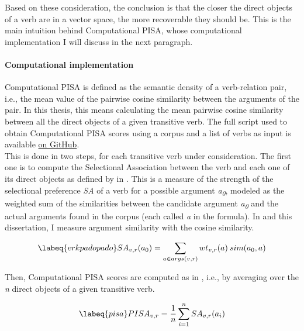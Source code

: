 Based on these consideration, the conclusion is that the closer the direct objects of a verb are in a vector space, the more recoverable they should be. This is the main intuition behind Computational PISA, whose computational implementation I will discuss in the next paragraph.

\paragraph{Computational implementation} Computational PISA is defined as the semantic density of a verb-relation pair, i.e., the mean value of the pairwise cosine similarity between the arguments of the pair. In this thesis, this means calculating the mean pairwise cosine similarity between all the direct objects of a given transitive verb. The full script used to obtain Computational PISA scores using a corpus and a list of verbs as input is available \href{https://github.com/ellepannitto/PISA}{on GitHub}. \\
This is done in two steps, for each transitive verb under consideration. The first one is to compute the Selectional Association between the verb and each one of its direct objects as defined by \textcite{Erk2007, ErkEtAl2010} in . This is a measure of the strength of the selectional preference \textit{SA} of a verb for a possible argument \textit{a\textsubscript{0}}, modeled as the weighted sum of the similarities between the candidate argument \textit{a\textsubscript{0}} and the actual arguments found in the corpus (each called \textit{a} in the formula). In \textcite{CappelliLenciPISA} and this dissertation, I measure argument similarity with the cosine similarity.

\begin{equation} \labeq{erkpadopado}
SA_{v,r} (a_0) = \sum_{a \in args(v,r)} wt_{v,r}(a) \: sim(a_0,a)
\end{equation}

Then, Computational PISA scores are computed as in , i.e., by averaging  over the \textit{n} direct objects of a given transitive verb.

\begin{equation} \labeq{pisa}
PISA_{v,r} = \frac{1}{n} \sum_{i = 1}^{n} SA_{v,r} (a_i)
\end{equation}

